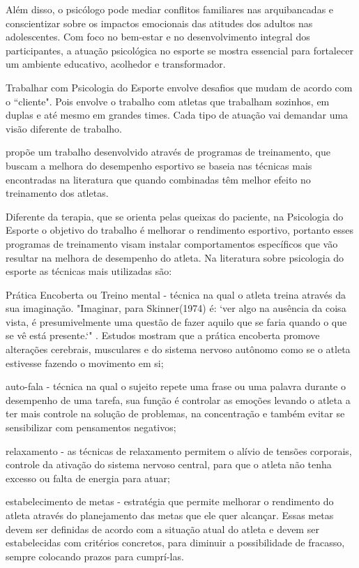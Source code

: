 \begin{Desenvolvimento}
Além disso, o psicólogo pode mediar conflitos familiares nas arquibancadas e conscientizar sobre os impactos emocionais das atitudes dos adultos nas adolescentes. Com foco no bem-estar e no desenvolvimento integral dos participantes, a atuação psicológica no esporte se mostra essencial para fortalecer um ambiente educativo, acolhedor e transformador.

Trabalhar com Psicologia do Esporte envolve desafios que mudam de acordo com o “cliente".  Pois envolve o trabalho com atletas que trabalham sozinhos, em duplas e até mesmo em grandes times. Cada tipo de atuação vai demandar uma visão diferente de trabalho. 

 propõe um trabalho desenvolvido através de programas de treinamento, que buscam a melhora do desempenho esportivo se baseia nas técnicas mais encontradas na literatura que quando combinadas têm melhor efeito no treinamento dos atletas. 

Diferente da terapia, que se orienta pelas queixas do paciente, na Psicologia do Esporte o objetivo do trabalho é melhorar o rendimento esportivo, portanto esses programas de treinamento visam instalar comportamentos específicos que vão resultar na melhora  de desempenho do atleta. Na literatura sobre psicologia do esporte as técnicas mais utilizadas são:

\begin{alinea}
  \item Prática Encoberta ou Treino mental - técnica na qual o atleta treina através da sua imaginação. "Imaginar, para Skinner(1974) é: `ver algo na ausência da coisa vista, é presumivelmente uma questão de fazer aquilo que se faria quando o que se vê está presente.`" . Estudos mostram que a prática encoberta promove alterações cerebrais, musculares e do sistema nervoso autônomo como se o atleta estivesse fazendo o movimento em si;
  \item auto-fala - técnica na qual o sujeito repete uma frase ou uma palavra durante o desempenho de uma tarefa, sua função é controlar as emoções levando o atleta a ter mais controle na solução de problemas, na concentração e também evitar se sensibilizar com pensamentos negativos;
  \item relaxamento - as técnicas de relaxamento permitem o alívio de tensões corporais, controle da ativação do sistema nervoso central, para que o atleta não tenha excesso ou falta de energia para atuar;
  \item estabelecimento de metas -  estratégia que permite melhorar o rendimento do atleta através do planejamento das metas que ele quer alcançar. Essas metas devem ser definidas de acordo com a situação atual do atleta e devem ser estabelecidas com critérios concretos, para diminuir a possibilidade de fracasso, sempre colocando prazos para cumprí-las.
\end{alinea}


\end{Desenvolvimento}
